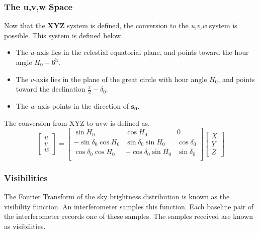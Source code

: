 \subsubsection{The u,v,w Space}
Now that the \textbf{XYZ} system is defined, the conversion to the \textit{u,v,w} system is possible. This system is defined below.
\begin{itemize}
    \item The $u$-axis lies in the celestial equatorial plane, and points toward the hour angle $H_0-6^\text{h}$.
    \item The $v$-axis lies in the plane of the great circle with hour angle $H_0$, and points toward the declination $\frac{\pi}{2}-\delta_0$.
    \item The $w$-axis points in the direction of $\mathbf{s_0}$.
\end{itemize}
The conversion from XYZ to uvw is defined as.
\begin{equation}
\begin{bmatrix}
u\\v\\w
\end{bmatrix}=
\begin{bmatrix}
\sin H_0 & \cos H_0 & 0\\ 
-\sin \delta_0 \cos H_0 & \sin\delta_0\sin H_0 & \cos\delta_0\\
\cos \delta_0 \cos H_0 & -\cos\delta_0\sin H_0 & \sin\delta_0\\
\end{bmatrix} 
\begin{bmatrix}
X\\Y\\Z
\end{bmatrix}
\end{equation}
\subsubsection{Visibilities}
The Fourier Transform of the sky brightness distribution is known as the visibility function. An interferometer samples this function. Each baseline pair of the interferometer records one of these samples. The samples received are known as visibilities.
